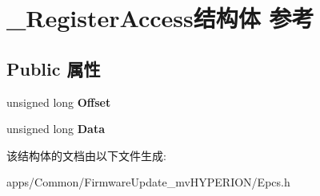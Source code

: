 \hypertarget{struct___register_access}{\section{\+\_\+\+Register\+Access结构体 参考}
\label{struct___register_access}
}
\subsection*{Public 属性}
\begin{DoxyCompactItemize}
\item 
\hypertarget{struct___register_access_ae5920303d8454b6e45cc959b3b12a6b0}{unsigned long {\bfseries Offset}}\label{struct___register_access_ae5920303d8454b6e45cc959b3b12a6b0}

\item 
\hypertarget{struct___register_access_a4d8f674bceffa8da411b2ba456e1e17c}{unsigned long {\bfseries Data}}\label{struct___register_access_a4d8f674bceffa8da411b2ba456e1e17c}

\end{DoxyCompactItemize}


该结构体的文档由以下文件生成\+:\begin{DoxyCompactItemize}
\item 
apps/\+Common/\+Firmware\+Update\+\_\+mv\+H\+Y\+P\+E\+R\+I\+O\+N/Epcs.\+h\end{DoxyCompactItemize}
